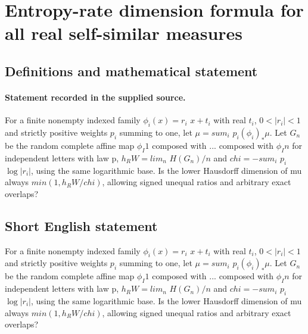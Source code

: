 \documentclass[11pt]{article}
\begin{document}
\section*{Entropy-rate dimension formula for all real self-similar measures}\label{30007172}
\subsection{Definitions and mathematical statement}
\paragraph{Statement recorded in the supplied source.}
For a finite nonempty indexed family $\phi _i(x)=r_i$ $x+t_i$ with real $t_i$, $0<|r_i|<1$ and strictly positive weights $p_i$ summing to one, let $\mu =sum_i$ $p_i(\phi _i)_*\mu $. Let $G_n$ be the random complete affine map $\phi _I1$ composed with ... composed with $\phi _In$ for independent letters with law p, $h_RW=lim_n$ $H(G_n)/n$ and $chi=-sum_i$ $p_i$ $\log |r_i|$, using the same logarithmic base. Is the lower Hausdorff dimension of mu always $min(1,h_RW/chi)$, allowing signed unequal ratios and arbitrary exact overlaps?
\subsection{Short English statement}
For a finite nonempty indexed family $\phi _i(x)=r_i$ $x+t_i$ with real $t_i$, $0<|r_i|<1$ and strictly positive weights $p_i$ summing to one, let $\mu =sum_i$ $p_i(\phi _i)_*\mu $. Let $G_n$ be the random complete affine map $\phi _I1$ composed with ... composed with $\phi _In$ for independent letters with law p, $h_RW=lim_n$ $H(G_n)/n$ and $chi=-sum_i$ $p_i$ $\log |r_i|$, using the same logarithmic base. Is the lower Hausdorff dimension of mu always $min(1,h_RW/chi)$, allowing signed unequal ratios and arbitrary exact overlaps?
\end{document}
